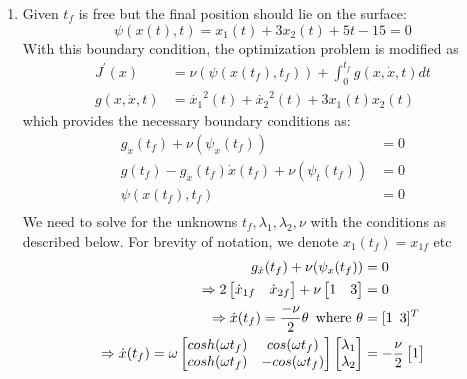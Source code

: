 \begin{enumerate}
\begin{enumerate}
   \item Given $t_f$ is free but the final position should lie on the surface:
   \begin{equation*}
   \psi(x(t),t) = x_1(t) + 3 x_2(t) + 5 t - 15 = 0
   \end{equation*}
   With this boundary condition, the optimization problem is modified as 
   \begin{align*}
    J^{\prime} (x) &= \nu (\psi(x(t_f), t_f)) + \int_0^{t_f} g(x,\dot x, t) dt\\
    g(x,\dot x, t) &= {\dot{x_1}}^2(t) + {\dot{x_2}}^2(t) + 3 x_1(t) x_2(t) 
   \end{align*}
   which provides the necessary boundary conditions as:
   \begin{align*}
   g_{\dot x} (t_f) + \nu (\psi_x(t_f)) &= 0 \\
   g(t_f) - g_{\dot x}(t_f) \dot x(t_f) + \nu (\psi_t(t_f)) &= 0 \\
   \psi(x(t_f),t_f) &= 0\\
   \end{align*}
   We need to solve for the unknowns $t_f, \lambda_1, \lambda_2, \nu$ with the conditions as described below. For brevity of notation, we denote $x_1(t_f) = x_{1f}$ etc
   \begin{align*}
   g_{\dot x} (t_f) + \nu (\psi_x(t_f)) &= 0 \\
   \Rightarrow 2 \begin{bmatrix}
               \dot x_{1f} & \dot x_{2f}
               \end{bmatrix} + \nu 
	       \begin{bmatrix}
	        1 & 3 
	       \end{bmatrix} &= 0 \\
    \Rightarrow \dot{x}(t_f) = \frac{-\nu}{2} \theta \enskip \text{where } \theta &= [1 \enskip 3]^{T}\\
    \Rightarrow \dot x(t_f) = \omega \begin{bmatrix}
                cosh(\omega t_f) & cos(\omega t_f) \\
		cosh(\omega t_f) & - cos(\omega t_f) \\
                \end{bmatrix} 
		\begin{bmatrix}
		 \lambda_1\\
		 \lambda_2 \\
		\end{bmatrix} &= -\frac{\nu}{2} 
		\begin{bmatrix}
		 1 \\

\end{bmatrix}
\end{align*}
\end{enumerate}
\end{enumerate}
